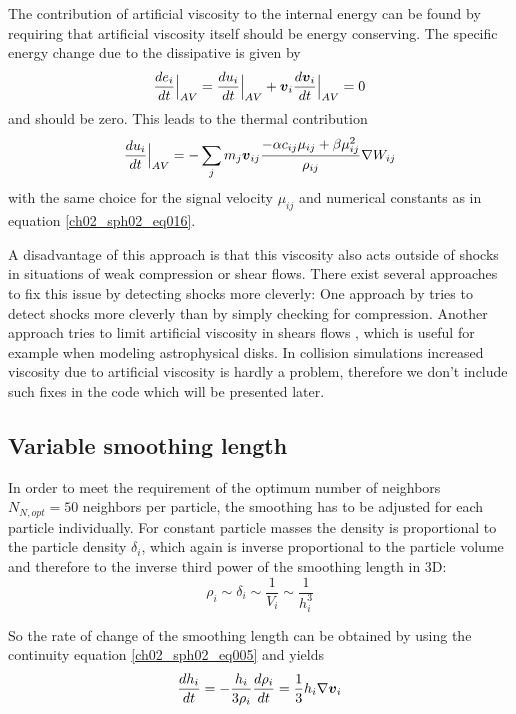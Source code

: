 The contribution of artificial viscosity to the internal energy can be found by requiring that artificial viscosity itself should be energy conserving. The specific energy change due to the dissipative is given by
\begin{equation}
\label{ch02_sph02_eq017}
\frac{de_i}{dt} \Big|_{AV}  = \frac{du_i}{dt}  \Big|_{AV} + \boldsymbol{v}_i \frac{d\boldsymbol{v}_i}{dt}  \Big|_{AV} = 0
\end{equation}
and should be zero. This leads to the thermal contribution
\begin{equation}
\label{ch02_sph02_eq018}
\frac{du_i }{dt} \Big|_{AV} = - \sum_{j} m_j \boldsymbol{v}_{ij} \frac{-\alpha c_{ij} \mu_{ij} + \beta \mu_{ij}^2}{\rho_{ij}} \nabla W_{ij}
\end{equation}
with the same choice for the signal velocity $\mu_{ij}$ and numerical constants as in equation \ref{ch02_sph02_eq016}.

A disadvantage of this approach is that this viscosity also acts outside of shocks in situations of weak compression or shear flows. There exist several approaches to fix this issue by detecting shocks more cleverly: One approach by \cite{Morris1997J.-Comput.-Phys.Morris} tries to detect shocks more cleverly than by simply checking for compression. Another approach tries to limit artificial viscosity in shears flows \citep{Balsara1995JCoPh.121..357B}, which is useful for example when modeling astrophysical disks. In collision simulations increased viscosity due to artificial viscosity is hardly a problem, therefore we don't include such fixes in the code which will be presented later.

\subsection{Variable smoothing length}
In order to meet the requirement of the optimum number of neighbors $N_{N,opt} = 50$ neighbors per particle, the smoothing has to be adjusted for each particle individually. For constant particle masses the density is proportional to the particle density $\delta_i$, which again is inverse proportional to the particle volume and therefore to the inverse third power of the smoothing length in 3D:
\begin{equation}
\label{ch02_sph02_eq026}
\rho_i \sim \delta_i \sim \frac{1}{V_i} \sim \frac{1}{h_i^3}
\end{equation}

So the rate of change of the smoothing length can be obtained by using the continuity equation \ref{ch02_sph02_eq005} and yields
\begin{equation}
\label{ch02_sph02_eq027}
\frac{d h_i}{dt} = - \frac{h_i}{3 \rho_i} \frac{d \rho_i}{dt} = \frac{1}{3} h_i \nabla \boldsymbol{v}_i
\end{equation}

